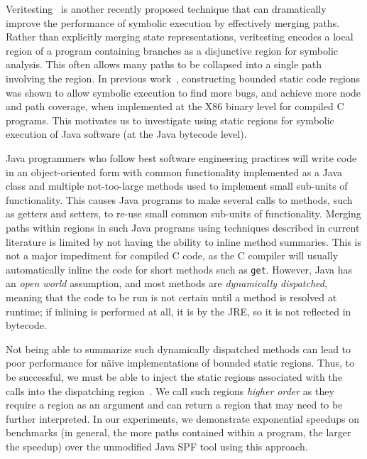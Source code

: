 %
 
%
Veritesting~\cite{veritesting} is another recently proposed technique that can dramatically improve the performance of symbolic execution by effectively merging paths.  Rather than explicitly merging state representations, veritesting encodes a local region of a program containing branches as a disjunctive region for symbolic analysis. This often allows many paths to be collapsed into a single path involving the region.  
%
In previous work~\cite{veritesting}, constructing bounded static code regions was shown to allow symbolic execution to find more bugs, and achieve more
node and path coverage, when implemented at the X86 binary level for compiled C programs.
%
This motivates us to investigate using static regions for symbolic execution of Java software (at the Java bytecode level).

Java programmers who follow best software engineering practices will write code in an object-oriented
form with common functionality implemented as a Java class and multiple not-too-large methods used to implement small
sub-units of functionality.
%
This causes Java programs to make several calls to methods, such as getters and setters, to re-use small common sub-units
of functionality.
%
Merging paths within regions in such Java programs using techniques described in current literature is limited by not having the ability
to inline method summaries.
%
This is not a major impediment for compiled C code, as the C compiler will usually automatically inline the code for short
methods such as \texttt{get}.
%
However, Java has an {\em open world} assumption, and most methods are {\em dynamically dispatched}, meaning that the code to be
run is not certain until a method is resolved at runtime; if inlining is performed at all, it is by the JRE, so it is not reflected in bytecode.

Not being able to summarize such dynamically dispatched methods can lead to poor performance for
n\"aive implementations of bounded static regions.
%
Thus, to be successful, we must be able to inject the static regions associated with the calls into the dispatching
region~\cite{sharma-veritesting}.
%
We call such regions {\em higher order} as they require a region as an argument and can return a region that may need
to be further interpreted.
%
In our experiments, we demonstrate exponential speedups on benchmarks (in general, the more paths contained within a
program, the larger the speedup) over the unmodified Java SPF tool using this approach.


